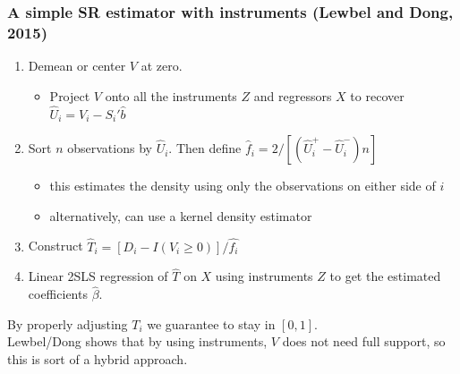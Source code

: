\documentclass[11pt,dvipsnames,table,aspectratio=169]{beamer}
\begin{document}

\begin{frame}
       \frametitle{A simple SR estimator with instruments (Lewbel and Dong, 2015)}
       \begin{enumerate}
       \item Demean or center $V$ at zero. 
       \begin{itemize}
              \item Project $V$ onto all the instruments $Z$ and regressors $X$ to recover $\hat U_i = V_i - S_i'\hat b$  
       \end{itemize}
       \item Sort $n$ observations by $\hat U_i$. Then define $\hat f_i = 2/ \left[(\hat U_i^+ - \hat U_i^-) n \right]$ 
       \begin{itemize}
              \item this estimates the density using only the observations on either side of $i$
              \item alternatively, can use a kernel density estimator
       \end{itemize}
       \item Construct $\hat{T}_i = [D_i -  I(V_i \geq 0)]/ \hat{f_i}$
       \item Linear 2SLS regression of $\hat{T}$ on $X$ using instruments $Z$ to get the estimated coefficients $\hat{\beta}$.
       \end{enumerate}
       By properly adjusting $T_i$ we guarantee to stay in $[0,1]$.\\[1em]

       Lewbel/Dong shows that by using instruments, $V$ does not need full support, so this is sort of a hybrid approach. 
\end{frame}
       
\end{document}
